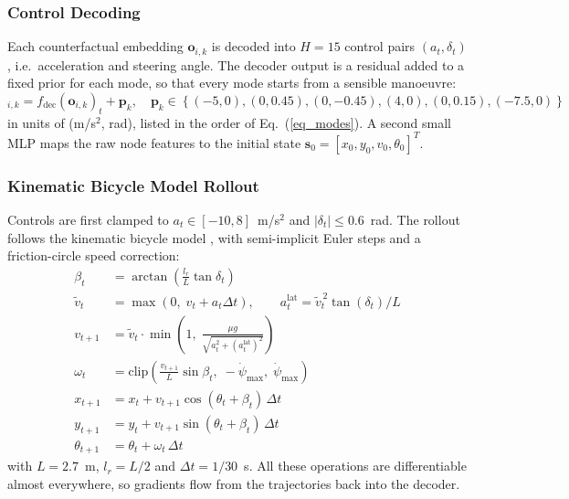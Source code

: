 \documentclass[preprint,12pt]{elsarticle}
\begin{document}
\subsubsection{Control Decoding}
Each counterfactual embedding $\mathbf{o}_{i,k}$ is decoded into $H = 15$ control pairs $(a_t, \delta_t)$, i.e.\ acceleration and steering angle. The decoder output is a residual added to a fixed prior for each mode, so that every mode starts from a sensible manoeuvre:
\begin{equation}
    [a_t, \delta_t]_{i,k} = f_{\text{dec}}(\mathbf{o}_{i,k})_t + \mathbf{p}_{k}, \quad
    \mathbf{p}_k \in \left\{(-5, 0), (0, 0.45), (0, -0.45), (4, 0), (0, 0.15), (-7.5, 0)\right\}
    \label{eq_prior}
\end{equation}
in units of (m/s$^2$, rad), listed in the order of Eq.~(\ref{eq_modes}). A second small MLP maps the raw node features to the initial state $\mathbf{s}_0 = [x_0, y_0, v_0, \theta_0]^T$.

\subsubsection{Kinematic Bicycle Model Rollout}
Controls are first clamped to $a_t \in [-10, 8]$~m/s$^2$ and $|\delta_t| \le 0.6$~rad. The rollout follows the kinematic bicycle model \cite{kong2015kinematic}, with semi-implicit Euler steps and a friction-circle speed correction:
\begin{align}
    \beta_t &= \arctan\left(\frac{l_r}{L} \tan \delta_t\right) \label{eq_slip} \\
    \tilde{v}_{t} &= \max\left(0, \; v_t + a_t \Delta t\right), \qquad a^{\text{lat}}_t = \tilde{v}_t^{\,2} \tan(\delta_t) / L \label{eq_v} \\
    v_{t+1} &= \tilde{v}_t \cdot \min\left(1, \; \frac{\mu g}{\sqrt{a_t^2 + (a^{\text{lat}}_t)^2}}\right) \label{eq_vfric} \\
    \omega_t &= \text{clip}\left(\frac{v_{t+1}}{L} \sin \beta_t, \; -\dot{\psi}_{\max}, \; \dot{\psi}_{\max}\right) \label{eq_yaw} \\
    x_{t+1} &= x_t + v_{t+1} \cos(\theta_t + \beta_t) \, \Delta t \label{eq_x} \\
    y_{t+1} &= y_t + v_{t+1} \sin(\theta_t + \beta_t) \, \Delta t \label{eq_y} \\
    \theta_{t+1} &= \theta_t + \omega_t \, \Delta t \label{eq_theta}
\end{align}
with $L = 2.7$~m, $l_r = L/2$ and $\Delta t = 1/30$~s. All these operations are differentiable almost everywhere, so gradients flow from the trajectories back into the decoder.
\end{document}
